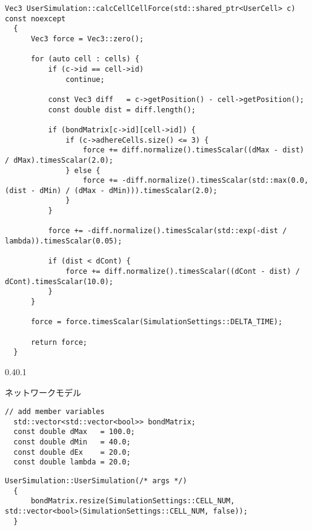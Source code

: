 \documentclass[vipdfmx,a4paper,11pt]{jsarticle}
\makeatletter
\renewcommand{\subsection}{%
  \@startsection{subsection}{1}{\z@}%
  {0.4\Cvs}{0.1\Cvs}%
  {\normalfont\large\headfont\raggedright}}
\makeatother
\begin{document}
\begin{lstlisting}[caption=calcCellCellForce()]
  Vec3 UserSimulation::calcCellCellForce(std::shared_ptr<UserCell> c) const noexcept
  {
      Vec3 force = Vec3::zero();
  
      for (auto cell : cells) {
          if (c->id == cell->id)
              continue;
  
          const Vec3 diff   = c->getPosition() - cell->getPosition();
          const double dist = diff.length();
  
          if (bondMatrix[c->id][cell->id]) {
              if (c->adhereCells.size() <= 3) {
                  force += diff.normalize().timesScalar((dMax - dist) / dMax).timesScalar(2.0);
              } else {
                  force += -diff.normalize().timesScalar(std::max(0.0, (dist - dMin) / (dMax - dMin))).timesScalar(2.0);
              }
          }
  
          force += -diff.normalize().timesScalar(std::exp(-dist / lambda)).timesScalar(0.05);
  
          if (dist < dCont) {
              force += diff.normalize().timesScalar((dCont - dist) / dCont).timesScalar(10.0);
          }
      }
  
      force = force.timesScalar(SimulationSettings::DELTA_TIME);
  
      return force;
  }
\end{lstlisting}

\subsection{ネットワークモデル}
\begin{lstlisting}[caption=UserSimulation.hpp]
  // add member variables
  std::vector<std::vector<bool>> bondMatrix;
  const double dMax   = 100.0;
  const double dMin   = 40.0;
  const double dEx    = 20.0;
  const double lambda = 20.0;
\end{lstlisting}

\begin{lstlisting}[caption=UserSimulation()]
  UserSimulation::UserSimulation(/* args */)
  {
      bondMatrix.resize(SimulationSettings::CELL_NUM, std::vector<bool>(SimulationSettings::CELL_NUM, false));
  }
\end{lstlisting}
\end{document}
